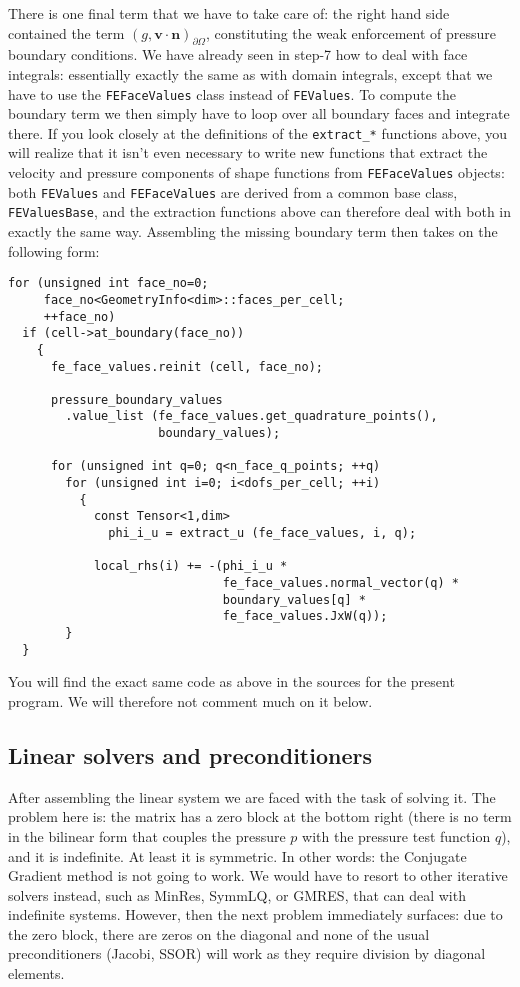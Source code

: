 \documentclass{article}
\renewcommand{\vec}[1]{\mathbf{#1}}
\begin{document}
There is one final term that we have to take care of: the right hand side
contained the term $(g,\vec v\cdot \vec n)_{\partial\Omega}$, constituting the
weak enforcement of pressure boundary conditions. We have already seen in
step-7 how to deal with face integrals: essentially exactly the same as with
domain integrals, except that we have to use the \texttt{FEFaceValues} class
instead of \texttt{FEValues}. To compute the boundary term we then simply have
to loop over all boundary faces and integrate there. If you look closely at
the definitions of the \texttt{extract\_*} functions above, you will realize
that it isn't even necessary to write new functions that extract the velocity
and pressure components of shape functions from \texttt{FEFaceValues} objects:
both \texttt{FEValues} and \texttt{FEFaceValues} are derived from a common
base class, \texttt{FEValuesBase}, and the extraction functions above can
therefore deal with both in exactly the same way. Assembling the missing
boundary term then takes on the following form:
\begin{verbatim}
for (unsigned int face_no=0;
     face_no<GeometryInfo<dim>::faces_per_cell;
     ++face_no)
  if (cell->at_boundary(face_no))
    {
      fe_face_values.reinit (cell, face_no);
    
      pressure_boundary_values
        .value_list (fe_face_values.get_quadrature_points(),
                     boundary_values);

      for (unsigned int q=0; q<n_face_q_points; ++q) 
        for (unsigned int i=0; i<dofs_per_cell; ++i)
          {
            const Tensor<1,dim>
              phi_i_u = extract_u (fe_face_values, i, q);
                
            local_rhs(i) += -(phi_i_u *
                              fe_face_values.normal_vector(q) *
                              boundary_values[q] *
                              fe_face_values.JxW(q));
        }
  }
\end{verbatim}

You will find the exact same code as above in the sources for the present
program. We will therefore not comment much on it below.


\subsection*{Linear solvers and preconditioners}

After assembling the linear system we are faced with the task of solving
it. The problem here is: the matrix has a zero block at the bottom right
(there is no term in the bilinear form that couples the pressure $p$ with the
pressure test function $q$), and it is indefinite. At least it is
symmetric. In other words: the Conjugate Gradient method is not going to
work. We would have to resort to other iterative solvers instead, such as
MinRes, SymmLQ, or GMRES, that can deal with indefinite systems. However, then
the next problem immediately surfaces: due to the zero block, there are zeros
on the diagonal and none of the usual preconditioners (Jacobi, SSOR) will work
as they require division by diagonal elements.
\end{document}
